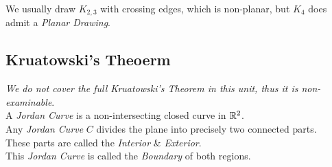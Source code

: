 \documentclass[11pt,a4paper]{article}
\begin{document}
We usually draw $K_{2,3}$ with crossing edges, which is non-planar, but $K_4$ does admit a \textit{Planar Drawing}.\\

\subsection{Kruatowski's Theoerm}
\textit{We do not cover the full Kruatowski's Theorem in this unit, thus it is non-examinable}.\\

A \textit{Jordan Curve} is a non-intersecting closed curve in $\mathbb{R}^2$.\\

Any \textit{Jordan Curve} $C$ divides the plane into precisely two connected parts.\\
These parts are called the \textit{Interior} \& \textit{Exterior}.\\
This \textit{Jordan Curve} is called the \textit{Boundary} of both regions.\\
\end{document}
